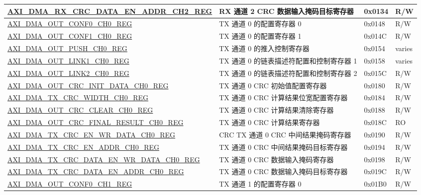 \begin{longtable}{ | l | l | p{1.3cm} | l | }
\hyperref[regdesc:AXIDMARXCRCDATAENADDRCHNREG]{AXI\_DMA\_RX\_CRC\_DATA\_EN\_ADDR\_CH2\_REG} & RX 通道 2 CRC 数据输入掩码目标寄存器 & 0x0134 & R/W \\ \hline
\hyperref[regdesc:AXIDMAOUTCONF0CHNREG]{AXI\_DMA\_OUT\_CONF0\_CH0\_REG} & TX 通道 0 的配置寄存器 0 & 0x0148 & R/W \\ \hline
\hyperref[regdesc:AXIDMAOUTCONF1CHNREG]{AXI\_DMA\_OUT\_CONF1\_CH0\_REG} & TX 通道 0 的配置寄存器 1 & 0x014C & R/W \\ \hline
\hyperref[regdesc:AXIDMAOUTPUSHCHNREG]{AXI\_DMA\_OUT\_PUSH\_CH0\_REG} & TX 通道 0 的推入控制寄存器 & 0x0154 & varies \\ \hline
\hyperref[regdesc:AXIDMAOUTLINK1CHNREG]{AXI\_DMA\_OUT\_LINK1\_CH0\_REG} & TX 通道 0 的链表描述符配置和控制寄存器 1 & 0x0158 & varies \\ \hline
\hyperref[regdesc:AXIDMAOUTLINK2CHNREG]{AXI\_DMA\_OUT\_LINK2\_CH0\_REG} & TX 通道 0 的链表描述符配置和控制寄存器 2 & 0x015C & R/W \\ \hline
\hyperref[regdesc:AXIDMAOUTCRCINITDATACHNREG]{AXI\_DMA\_OUT\_CRC\_INIT\_DATA\_CH0\_REG} & TX 通道 0 CRC 初始值配置寄存器 & 0x0180 & R/W \\ \hline
\hyperref[regdesc:AXIDMATXCRCWIDTHCHNREG]{AXI\_DMA\_TX\_CRC\_WIDTH\_CH0\_REG} & TX 通道 0 CRC 计算结果位宽配置寄存器 & 0x0184 & R/W \\ \hline
\hyperref[regdesc:AXIDMAOUTCRCCLEARCHNREG]{AXI\_DMA\_OUT\_CRC\_CLEAR\_CH0\_REG} & TX 通道 0 CRC 计算结果清除寄存器 & 0x0188 & R/W \\ \hline
\hyperref[regdesc:AXIDMAOUTCRCFINALRESULTCHNREG]{AXI\_DMA\_OUT\_CRC\_FINAL\_RESULT\_CH0\_REG} & TX 通道 0 CRC 计算结果寄存器 & 0x018C & RO \\ \hline
\hyperref[regdesc:AXIDMATXCRCENWRDATACHNREG]{AXI\_DMA\_TX\_CRC\_EN\_WR\_DATA\_CH0\_REG} & CRC TX 通道 0 CRC 中间结果掩码寄存器 & 0x0190 & R/W \\ \hline
\hyperref[regdesc:AXIDMATXCRCENADDRCHNREG]{AXI\_DMA\_TX\_CRC\_EN\_ADDR\_CH0\_REG} & TX 通道 0 CRC 中间结果掩码目标寄存器 & 0x0194 & R/W \\ \hline
\hyperref[regdesc:AXIDMATXCRCDATAENWRDATACHNREG]{AXI\_DMA\_TX\_CRC\_DATA\_EN\_WR\_DATA\_CH0\_REG} & TX 通道 0 CRC 数据输入掩码寄存器 & 0x0198 & R/W \\ \hline
\hyperref[regdesc:AXIDMATXCRCDATAENADDRCHNREG]{AXI\_DMA\_TX\_CRC\_DATA\_EN\_ADDR\_CH0\_REG} & TX 通道 0 CRC 数据输入掩码目标寄存器 & 0x019C & R/W \\ \hline
\hyperref[regdesc:AXIDMAOUTCONF0CHNREG]{AXI\_DMA\_OUT\_CONF0\_CH1\_REG} & TX 通道 1 的配置寄存器 0 & 0x01B0 & R/W \\ \hline

\end{longtable}
